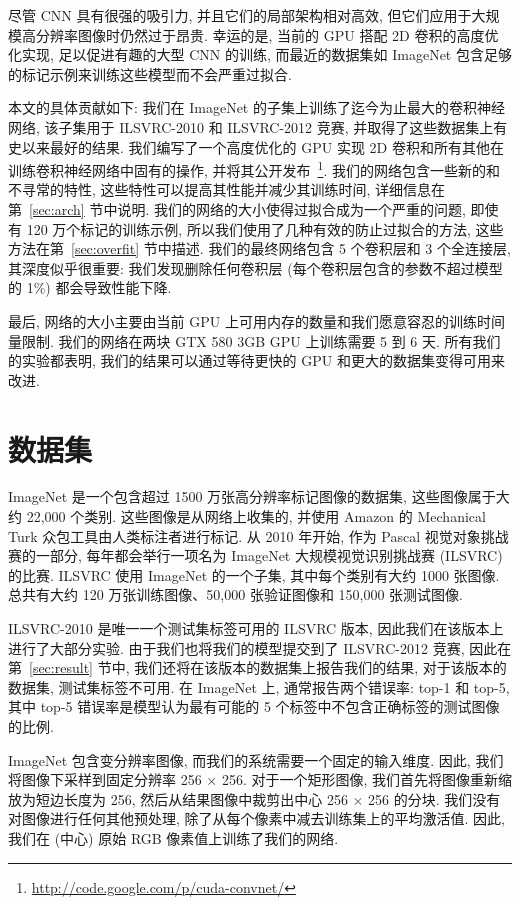 \documentclass{article} %
\begin{document}
尽管 CNN 具有很强的吸引力, 并且它们的局部架构相对高效, 但它们应用于大规模高分辨率图像时仍然过于昂贵. 幸运的是, 当前的 GPU 搭配 2D 卷积的高度优化实现, 足以促进有趣的大型 CNN 的训练, 而最近的数据集如 ImageNet 包含足够的标记示例来训练这些模型而不会严重过拟合.

本文的具体贡献如下: 我们在 ImageNet 的子集上训练了迄今为止最大的卷积神经网络, 该子集用于 ILSVRC-2010 和 ILSVRC-2012 竞赛, 并取得了这些数据集上有史以来最好的结果. 我们编写了一个高度优化的 GPU 实现 2D 卷积和所有其他在训练卷积神经网络中固有的操作, 并将其公开发布~\footnote{\url{http://code.google.com/p/cuda-convnet/}}. 我们的网络包含一些新的和不寻常的特性, 这些特性可以提高其性能并减少其训练时间, 详细信息在第~\ref{sec:arch} 节中说明. 我们的网络的大小使得过拟合成为一个严重的问题, 即使有 120 万个标记的训练示例, 所以我们使用了几种有效的防止过拟合的方法, 这些方法在第~\ref{sec:overfit} 节中描述. 我们的最终网络包含 5 个卷积层和 3 个全连接层, 其深度似乎很重要: 我们发现删除任何卷积层 (每个卷积层包含的参数不超过模型的 1\%) 都会导致性能下降.

最后, 网络的大小主要由当前 GPU 上可用内存的数量和我们愿意容忍的训练时间量限制. 我们的网络在两块 GTX 580 3GB GPU 上训练需要 5 到 6 天. 所有我们的实验都表明, 我们的结果可以通过等待更快的 GPU 和更大的数据集变得可用来改进.
\vspace{-1mm}
\section{数据集}
\vspace{-2ex}

ImageNet 是一个包含超过 1500 万张高分辨率标记图像的数据集, 这些图像属于大约 22,000 个类别. 这些图像是从网络上收集的, 并使用 Amazon 的 Mechanical Turk 众包工具由人类标注者进行标记. 从 2010 年开始, 作为 Pascal 视觉对象挑战赛的一部分, 每年都会举行一项名为 ImageNet 大规模视觉识别挑战赛 (ILSVRC) 的比赛. ILSVRC 使用 ImageNet 的一个子集, 其中每个类别有大约 1000 张图像. 总共有大约 120 万张训练图像、50,000 张验证图像和 150,000 张测试图像.

ILSVRC-2010 是唯一一个测试集标签可用的 ILSVRC 版本, 因此我们在该版本上进行了大部分实验. 由于我们也将我们的模型提交到了 ILSVRC-2012 竞赛, 因此在第~\ref{sec:result} 节中, 我们还将在该版本的数据集上报告我们的结果, 对于该版本的数据集, 测试集标签不可用. 在 ImageNet 上, 通常报告两个错误率: top-1 和 top-5, 其中 top-5 错误率是模型认为最有可能的 5 个标签中不包含正确标签的测试图像的比例.

ImageNet 包含变分辨率图像, 而我们的系统需要一个固定的输入维度. 因此, 我们将图像下采样到固定分辨率 256 $\times$ 256. 对于一个矩形图像, 我们首先将图像重新缩放为短边长度为 256, 然后从结果图像中裁剪出中心 256 $\times$ 256 的分块. 我们没有对图像进行任何其他预处理, 除了从每个像素中减去训练集上的平均激活值. 因此, 我们在 (中心) 原始 RGB 像素值上训练了我们的网络.
\end{document}
